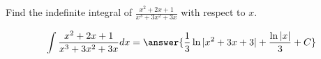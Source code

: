 \documentclass{ximera}
\author{Gregory Hartman \and Matthew Carr}
\begin{document}
\begin{exercise}

Find the indefinite integral of $\frac{x^2+2 x+1}{x^3+3 x^2+3 x}$ with respect to $x$.

\[
\int \frac{x^2+2 x+1}{x^3+3 x^2+3 x} dx=\answer{\frac{1}{3} \ln|x^2+3 x+3|+\frac{\ln|x|}{3}+C}
\]

\end{exercise}
\end{document}
